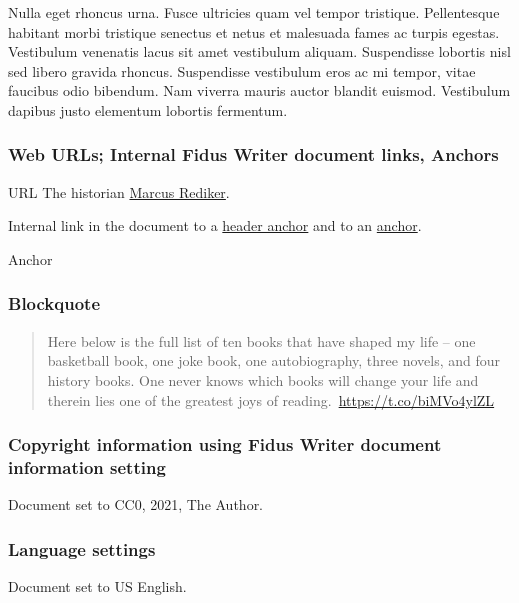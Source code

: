\documentclass{article}
\begin{document}
Nulla eget rhoncus urna. Fusce ultricies quam vel tempor tristique. Pellentesque habitant morbi tristique senectus et netus et malesuada fames ac turpis egestas. Vestibulum venenatis lacus sit amet vestibulum aliquam. Suspendisse lobortis nisl sed libero gravida rhoncus. Suspendisse vestibulum eros ac mi tempor, vitae faucibus odio bibendum. Nam viverra mauris auctor blandit euismod. Vestibulum dapibus justo elementum lobortis fermentum.


\subsubsection{Web URLs; Internal Fidus Writer document links, Anchors}\label{H4364111}



URL The historian \href{https://www.marcusrediker.com/}{Marcus Rediker}.


Internal link in the document to a \hyperlink{H1581297}{header anchor} and to an \hyperlink{A746704}{anchor}.


Anchor


\subsubsection{Blockquote}\label{H758728}


\begin{quote}



Here below is the full list of ten books that have shaped my life – one basketball book, one joke book, one autobiography, three novels, and four history books. One never knows which books will change your life and therein lies one of the greatest joys of reading. \href{https://t.co/biMVo4ylZL}{https://t.co/biMVo4ylZL}


\end{quote}


\subsubsection{Copyright information using Fidus Writer document information setting}\label{H3595888}



Document set to CC0, 2021, The Author.


\subsubsection{Language settings}\label{H5763006}



Document set to US English.


\printbibliography[title={Bibliography}]
\end{document}
